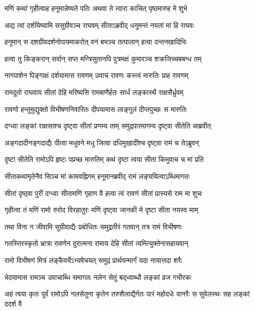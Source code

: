 \twolineshloka
{मणिं कथां गृहीत्वाह हनूमान्नेष्यते पतिः }
{अथवा ते त्वारा काचित् पृष्ठमारुह मे शुभे}%

\twolineshloka
{अद्य त्वां दर्शयिष्यामि ससुग्रीवञ्च राघवम् }
{सीताऽब्रवीद् धनूमन्तं नयतां मां हि राघवः}%

\twolineshloka
{हनूमान् स दशग्रीवदर्शनोपायमाकरोत्}
{वनं बभञ्च तत्पालान् हत्वा दन्तनखादिभिः}%

\twolineshloka
{हत्वा तु किङ्करान् सर्वान् सप्त मन्त्रिसुतानपि}
{पुत्रमक्षं कुमारञ्च शक्रजिच्चबबन्ध तम्}%

\twolineshloka
{नागपाशेन पिङ्गाक्षं दर्शयामास रावणम्}
{उवाच रावणः कस्त्वं मारुतिः प्राह रावणम्}%

\twolineshloka
{रामदूतो राघवाय सीतां देहि मरिष्यसि}
{रामबाणैर्हतः सार्धं लङ्कास्थै राक्षसैर्ध्रुवम्}%

\twolineshloka
{रावणो हन्तुमुद्युक्तो विभीषणनिवारितः}
{दीपयामास लाङ्गूलं दीप्तपुच्छः स मारुतिः}%

\twolineshloka
{दग्ध्वा लङ्कां राक्षसाश्च दृष्ट्वा सीतां प्रणम्य ताम्}
{समुद्रपारमागम्य दृष्ट्वा सीतेति चाब्रवीत्}%

\twolineshloka
{अङ्गदादीनङ्गदाद्यैः पीत्वा मधुवने मधु}
{जित्वा दधिमुखादींश्च दृष्ट्वा रामं च तेऽब्रुवन्}%

\twolineshloka
{दृष्टा सीतेति रामोऽपि हृष्टः पप्रच्छ मारुतिम्}
{कथं दृष्टा त्वया सीता किमुवाच च मां प्रति}%

\twolineshloka
{सीताकथामृतेनैव सिञ्च मां कामवह्निगम्}
{हनूमानब्रवीद् रामं लङ्घयित्वाऽब्धिमागतः}%

\twolineshloka
{सीतां दृष्ठ्वा पुरीं दग्ध्वा सीतामणिं गृहाण वै}
{हत्वा त्वं रावणं सीतां प्रास्यसे राम मा शुचः}%

\twolineshloka
{गृहीत्वा तं मणिं रामो रुरोद विरहातुरः }
{मणिं दृष्ट्वा जानकी मे दृष्टा सीता नयस्व माम्}%

\twolineshloka
{तथा विना न जीवामि सुग्रीवाद्यैः प्रबोधितः}
{समुद्रतीरं गतवान् तत्र रामं विभीषणः}%

\twolineshloka
{गतस्तिरस्कृतो भ्रात्रा रावणेन दुरात्मना}
{रामाय देहि सीतां त्वमित्युक्तेनासहायवान्}%

\twolineshloka
{रामो विभीषणं मित्रं लङ्कैवर्येऽभ्यषेचयत्}
{समुद्रं प्रार्थयन्मार्गं यदा नायात्तदा शरैः}%

\twolineshloka
{भेदयामास रामञ्च उवाचाब्धि समागतः}
{नलेन सेतुं बद्‌ध्वाब्धौ लङ्कां व्रज गभीरकः}%

\threelineshloka
{अहं त्वया कृतः पूर्वं रामोऽपि नलसेतुना}
{कृतेन तरुशैलाद्यैर्गतः पारं महोदधेः}
{वानरैः स सुवेलस्थः सह लङ्कां ददर्श वै} %

